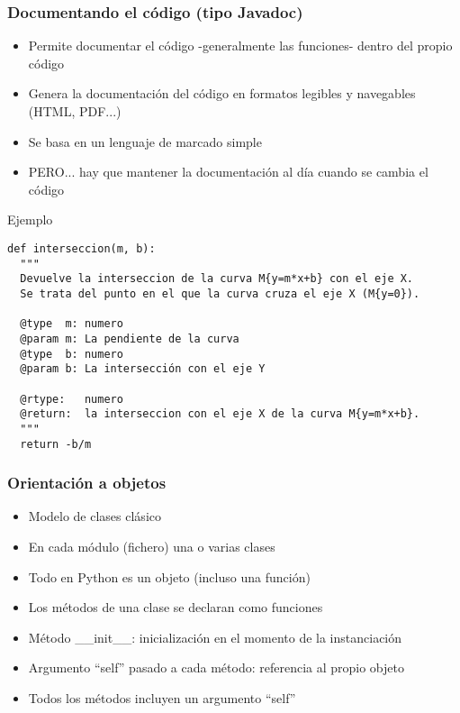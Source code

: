 \begin{frame}
\frametitle{Documentando el código (tipo Javadoc)}

\begin{small}
\begin{itemize}
\item Permite documentar el código -generalmente las funciones- dentro del propio código
\item Genera la documentación del código en formatos legibles y navegables
(HTML, PDF...)
\item Se basa en un lenguaje de marcado simple
\item PERO... hay que mantener la documentación al día cuando se cambia
el código
\end{itemize}
\end{small}
\end{frame}

\begin{frame}[fragile]
Ejemplo

\begin{small}
\begin{verbatim}
def interseccion(m, b):
  """
  Devuelve la interseccion de la curva M{y=m*x+b} con el eje X. 
  Se trata del punto en el que la curva cruza el eje X (M{y=0}).

  @type  m: numero
  @param m: La pendiente de la curva
  @type  b: numero
  @param b: La intersección con el eje Y

  @rtype:   numero
  @return:  la interseccion con el eje X de la curva M{y=m*x+b}.
  """
  return -b/m
\end{verbatim}
\end{small}
  
\end{frame}

\begin{frame}
\frametitle{Orientación a objetos}

\begin{itemize}
\item Modelo de clases clásico
\item En cada módulo (fichero) una o varias clases
\item Todo en Python es un objeto (incluso una función)
\item Los métodos de una clase se declaran como funciones
\item Método \_\_init\_\_: inicialización en el momento de la instanciación
\item Argumento ``self'' pasado a cada método: referencia al propio objeto
\item Todos los métodos incluyen un argumento ``self''
\end{itemize}

\end{frame}

